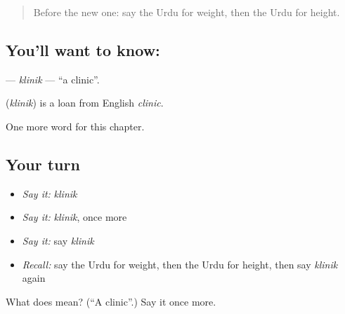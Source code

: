 \begin{quote}
Before the new one: say the Urdu for weight, then the Urdu for height.
\end{quote}

\subsection*{You'll want to know: }
\textbf{} — \emph{klinik} — \textquotedblleft{}a clinic\textquotedblright{}.

\begin{cousinweb}
\textbf{} (\emph{klinik}) is a loan from English \emph{clinic}.
\end{cousinweb}

\begin{grammarlens}[title={What you've built}]
One more word for this chapter.
\end{grammarlens}

\subsection*{Your turn}
\begin{itemize}
\raggedright
  \item \emph{Say it:} \emph{klinik}
  \item \emph{Say it:} \emph{klinik}, once more
  \item \emph{Say it:} say \emph{klinik}
  \item \emph{Recall:} say the Urdu for weight, then the Urdu for height, then say \emph{klinik} again
\end{itemize}

\begin{tcolorbox}[breakable,colback=teal!4,colframe=teal!35!black,title={Before you move on}]
What does  mean? (\textquotedblleft{}A clinic\textquotedblright{}.) Say it once more.
\end{tcolorbox}
